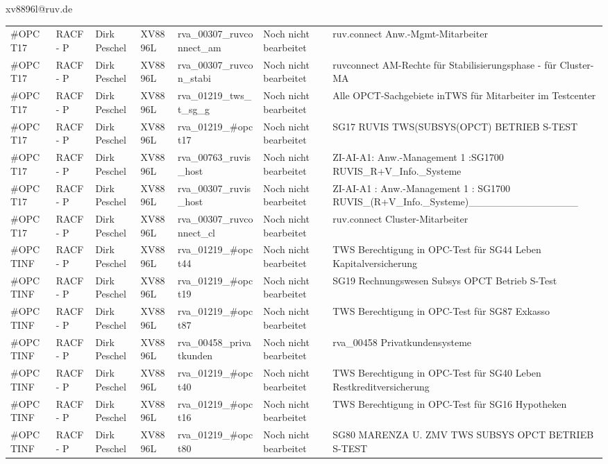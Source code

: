 \documentclass[a4paper,landscape,12pt]{letter}
\begin{document}
\begin{letter}{xv8896l@ruv.de\hfill \break}
\begin{tiny}
\begin{longtable}{|p{35mm}|p{15mm}|p{25mm}|p{10mm}|p{40mm}|p{50mm}|p{50mm}|}
\#OPCT17 & RACF - P & Dirk Peschel & XV8896L & rva\_00307\_ruvconnect\_am & Noch nicht bearbeitet & ruv.connect Anw.-Mgmt-Mitarbeiter \\
\#OPCT17 & RACF - P & Dirk Peschel & XV8896L & rva\_00307\_ruvcon\_stabi & Noch nicht bearbeitet & ruvconnect AM-Rechte für Stabilisierungsphase - für Cluster-MA \\
\#OPCT17 & RACF - P & Dirk Peschel & XV8896L & rva\_01219\_tws\_t\_sg\_g & Noch nicht bearbeitet & Alle OPCT-Sachgebiete inTWS für Mitarbeiter im Testcenter \\
\#OPCT17 & RACF - P & Dirk Peschel & XV8896L & rva\_01219\_\#opct17 & Noch nicht bearbeitet & SG17 RUVIS TWS(SUBSYS(OPCT) BETRIEB S-TEST \\
\#OPCT17 & RACF - P & Dirk Peschel & XV8896L & rva\_00763\_ruvis\_host & Noch nicht bearbeitet & ZI-AI-A1: Anw.-Management 1 :SG1700 RUVIS\_R+V\_Info.\_Systeme \\
\#OPCT17 & RACF - P & Dirk Peschel & XV8896L & rva\_00307\_ruvis\_host & Noch nicht bearbeitet & ZI-AI-A1   : Anw.-Management 1 : SG1700 RUVIS\_(R+V\_Info.\_Systeme)\_\_\_\_\_\_\_\_\_\_\_\_\_\_\_ \\
\#OPCT17 & RACF - P & Dirk Peschel & XV8896L & rva\_00307\_ruvconnect\_cl & Noch nicht bearbeitet & ruv.connect Cluster-Mitarbeiter \\
\#OPCTINF & RACF - P & Dirk Peschel & XV8896L & rva\_01219\_\#opct44 & Noch nicht bearbeitet & TWS Berechtigung in OPC-Test für SG44 Leben Kapitalversicherung \\
\#OPCTINF & RACF - P & Dirk Peschel & XV8896L & rva\_01219\_\#opct19 & Noch nicht bearbeitet & SG19 Rechnungswesen Subsys OPCT Betrieb S-Test \\
\#OPCTINF & RACF - P & Dirk Peschel & XV8896L & rva\_01219\_\#opct87 & Noch nicht bearbeitet & TWS Berechtigung in OPC-Test für SG87 Exkasso \\
\#OPCTINF & RACF - P & Dirk Peschel & XV8896L & rva\_00458\_privatkunden & Noch nicht bearbeitet & rva\_00458 Privatkundensysteme \\
\#OPCTINF & RACF - P & Dirk Peschel & XV8896L & rva\_01219\_\#opct40 & Noch nicht bearbeitet & TWS Berechtigung in OPC-Test für SG40 Leben Restkreditversicherung \\
\#OPCTINF & RACF - P & Dirk Peschel & XV8896L & rva\_01219\_\#opct16 & Noch nicht bearbeitet & TWS Berechtigung in OPC-Test für SG16 Hypotheken \\
\#OPCTINF & RACF - P & Dirk Peschel & XV8896L & rva\_01219\_\#opct80 & Noch nicht bearbeitet & SG80 MARENZA U. ZMV TWS SUBSYS OPCT BETRIEB S-TEST \\

\end{longtable}
\end{tiny}
\end{letter}
\end{document}
